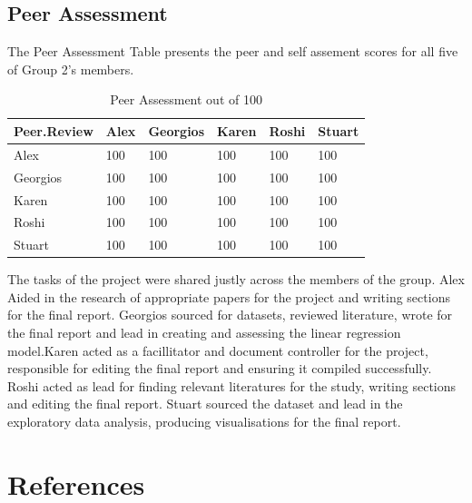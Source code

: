 \documentclass[10pt]{article}\usepackage[]{graphicx}\usepackage[]{color}
\begin{document}
\subsection{Peer Assessment}

The Peer Assessment Table presents the peer and self assement scores for all five of Group 2's members.\\

\begin{table}[H]
\centering
\caption{Peer Assessment out of 100} 
\label{tab:two}
\begin{tabular}{llllll}
  \hline
Peer.Review & Alex & Georgios & Karen & Roshi & Stuart \\ 
  \hline
Alex & 100 & 100 & 100 & 100 & 100 \\ 
  Georgios & 100 & 100 & 100 & 100 & 100 \\ 
  Karen & 100 & 100 & 100 & 100 & 100 \\ 
  Roshi & 100 & 100 & 100 & 100 & 100 \\ 
  Stuart & 100 & 100 & 100 & 100 & 100 \\ 
   \hline
\end{tabular}
\end{table}



The tasks of the project were shared justly across the members of the group. Alex Aided in the research of appropriate papers for the project and writing sections for the final report. Georgios sourced for datasets, reviewed literature, wrote for the final report and lead in creating and assessing the linear regression model.Karen acted as a facillitator and document controller for the project, responsible for editing the final report and ensuring it compiled successfully. Roshi acted as lead for finding relevant literatures for the study, writing sections and editing the final report. Stuart sourced the dataset and lead in the exploratory data analysis, producing visualisations for the final report.\\


\pagebreak
\section*{References}\label{pubs}
\printbibliography[heading=none]
\end{document}
